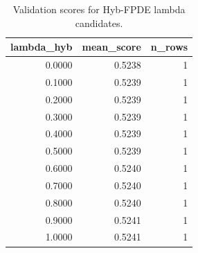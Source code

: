 \begin{table}[t]
\caption{Validation scores for Hyb-FPDE lambda candidates.}
\label{tab:lambda_distribution_computed}
\centering
\begin{tabular}{rrr}
\toprule
lambda\_hyb & mean\_score & n\_rows \\
\midrule
0.0000 & 0.5238 & 1 \\
0.1000 & 0.5239 & 1 \\
0.2000 & 0.5239 & 1 \\
0.3000 & 0.5239 & 1 \\
0.4000 & 0.5239 & 1 \\
0.5000 & 0.5239 & 1 \\
0.6000 & 0.5240 & 1 \\
0.7000 & 0.5240 & 1 \\
0.8000 & 0.5240 & 1 \\
0.9000 & 0.5241 & 1 \\
1.0000 & 0.5241 & 1 \\
\bottomrule
\end{tabular}

\end{table}
